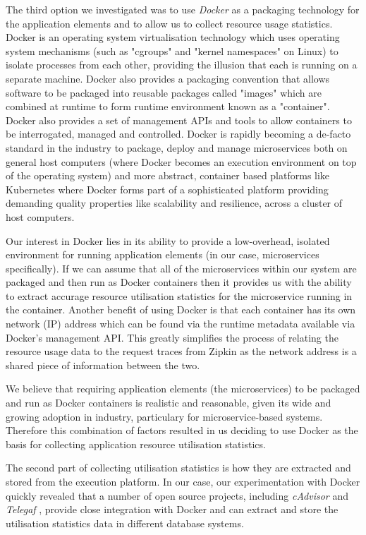 The third option we investigated was to use \emph{Docker} \cite{docker2018} as a packaging technology for the application elements and to allow us to collect resource usage statistics.  Docker is an operating system virtualisation technology which uses operating system mechanisms (such as "cgroups" and "kernel namespaces" on Linux) to isolate processes from each other, providing the illusion that each is running on a separate machine.  Docker also provides a packaging convention that allows software to be packaged into reusable packages called "images" which are combined at runtime to form runtime environment known as a "container".  Docker also provides a set of management APIs and tools to allow containers to be interrogated, managed and controlled.  Docker is rapidly becoming a de-facto standard in the industry to package, deploy and manage microservices both on general host computers (where Docker becomes an execution environment on top of the operating system) and more abstract, container based platforms like Kubernetes \cite{kubernetes2018} where Docker forms part of a sophisticated platform providing demanding quality properties like scalability and resilience, across a cluster of host computers.

Our interest in Docker lies in its ability to provide a low-overhead, isolated environment for running application elements (in our case, microservices specifically).  If we can assume that all of the microservices within our system are packaged and then run as Docker containers then it provides us with the ability to extract accurage resource utilisation statistics for the microservice running in the container.  Another benefit of using Docker is that each container has its own network (IP) address which can be found via the runtime metadata available via Docker's management API.  This greatly simplifies the process of relating the resource usage data to the request traces from Zipkin as the network address is a shared piece of information between the two.

We believe that requiring application elements (the microservices) to be packaged and run as Docker containers is realistic and reasonable, given its wide and growing adoption in industry, particulary for microservice-based systems.  Therefore this combination of factors resulted in us deciding to use Docker as the basis for collecting application resource utilisation statistics.

The second part of collecting utilisation statistics is how they are extracted and stored from the execution platform.  In our case, our experimentation with Docker quickly revealed that a number of open source projects, including \emph{cAdvisor} \cite{cadvisor2018} and \emph{Telegaf} \cite{telegraf2018}, provide close integration with Docker and can extract and store the utilisation statistics data in different database systems.

